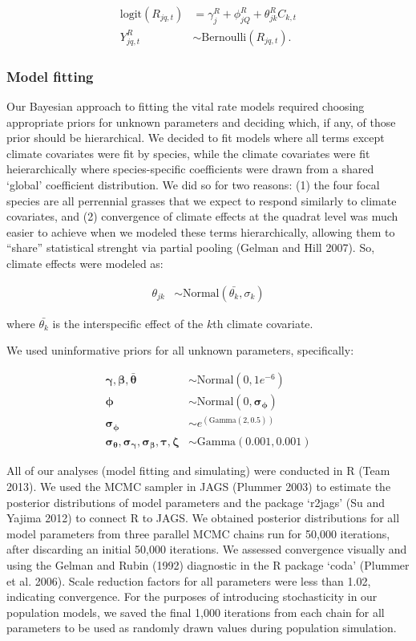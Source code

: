\documentclass[12pt,]{article}
\begin{document}
\begin{align}
\text{logit}(R_{jq,t}) &= \gamma^{R}_{j} + \phi^{R}_{jQ} + \theta^{R}_{jk}C_{k,t} \\
Y^{R}_{jq,t} &\sim \text{Bernoulli}(R_{jq,t}).
\end{align}

\subsubsection{Model fitting}\label{model-fitting}

Our Bayesian approach to fitting the vital rate models required choosing
appropriate priors for unknown parameters and deciding which, if any, of
those prior should be hierarchical. We decided to fit models where all
terms except climate covariates were fit by species, while the climate
covariates were fit heierarchically where species-specific coefficients
were drawn from a shared `global' coefficient distribution. We did so
for two reasons: (1) the four focal species are all perrennial grasses
that we expect to respond similarly to climate covariates, and (2)
convergence of climate effects at the quadrat level was much easier to
achieve when we modeled these terms hierarchically, allowing them to
``share'' statistical strenght via partial pooling (Gelman and Hill
2007). So, climate effects were modeled as:

\begin{align}
\theta_{jk} &\sim \text{Normal}(\bar{\theta_{k}}, \sigma_{k})
\end{align}

where $\bar{\theta_{k}}$ is the interspecific effect of the $k$th
climate covariate.

We used uninformative priors for all unknown parameters, specifically:

\begin{align}
\boldsymbol{\gamma, \beta, \bar{\theta}} &\sim \text{Normal}(0, 1e^{-6}) \\
\boldsymbol{\phi} &\sim \text{Normal}(0, \boldsymbol{\sigma_{\phi}}) \\
\boldsymbol{\sigma_{\phi}} &\sim e^{(\text{Gamma}(2, 0.5))} \\
\boldsymbol{\sigma_{\theta}, \sigma_{\gamma}, \sigma_{\beta}, \tau, \zeta} &\sim \text{Gamma}(0.001, 0.001)
\end{align}

All of our analyses (model fitting and simulating) were conducted in R
(Team 2013). We used the MCMC sampler in JAGS (Plummer 2003) to estimate
the posterior distributions of model parameters and the package `r2jags'
(Su and Yajima 2012) to connect R to JAGS. We obtained posterior
distributions for all model parameters from three parallel MCMC chains
run for 50,000 iterations, after discarding an initial 50,000
iterations. We assessed convergence visually and using the Gelman and
Rubin (1992) diagnostic in the R package `coda' (Plummer et al. 2006).
Scale reduction factors for all parameters were less than 1.02,
indicating convergence. For the purposes of introducing stochasticity in
our population models, we saved the final 1,000 iterations from each
chain for all parameters to be used as randomly drawn values during
population simulation.
\end{document}
